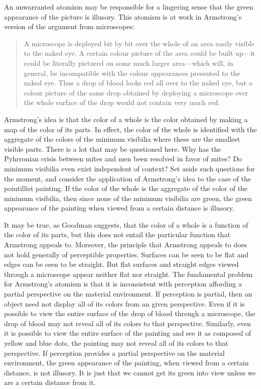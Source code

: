 \documentclass[12pt]{article}
\begin{document}
An unwarranted atomism may be responsible for a lingering sense that the green appearance of the picture is illusory. This atomism is at work in Armstrong's version of the argument from microscopes:
	\begin{quote}
		A microscope is deployed bit by bit over the whole of an area easily visible to the naked eye. A certain colour picture of the area could be built up---it could be literally pictured on some much larger area---which will, in general, be incompatible with the colour appearances presented to the naked eye. Thus a drop of blood looks red all over to the naked eye, but a colour picture of the same drop obtained by deploying a microscope over the whole surface of the drop would not contain very much red. \citep[108]{Armstrong:1968nx}
	\end{quote}
Armstrong's idea is that the color of a whole is the color obtained by making a map of the color of its parts. In effect, the color of the whole is identified with the aggregate of the colors of the minimum visibilia where these are the smallest visible parts. There is a lot that may be questioned here. Why has the Pyhrronian crisis between mites and men been resolved in favor of mites? Do minimum visibilia even exist independent of context? Set aside such questions for the moment, and consider the application of Armstrong's idea to the case of the pointillist painting. If the color of the whole is the aggregate of the color of the minimum visibilia, then since none of the minimum visibilia are green, the green appearance of the painting when viewed from a certain distance is illusory.

It may be true, as Goodman suggests, that the color of a whole is a function of the color of its parts, but this does not entail the particular function that Armstrong appeals to. Moreover, the principle that Armstrong appeals to does not hold generally of perceptible properties. Surfaces can be seen to be flat and edges can be seen to be straight. But flat surfaces and straight edges viewed through a microscope appear neither flat nor straight. The fundamental problem for Armstrong's atomism is that it is inconsistent with perception affording a partial perspective on the material environment. If perception is partial, then an object need not display all of its colors from an given perspective. Even if it is possible to view the entire surface of the drop of blood through a microscope, the drop of blood may not reveal all of its colors to that perspective. Similarly, even it is possible to view the entire surface of the painting and see it as composed of yellow and blue dots, the painting may not reveal all of its colors to that perspective. If perception provides a partial perspective on the material environment, the green appearance of the painting, when viewed from a certain distance, is not illusory. It is just that we cannot get its green into view unless we are a certain distance from it.
\end{document}
